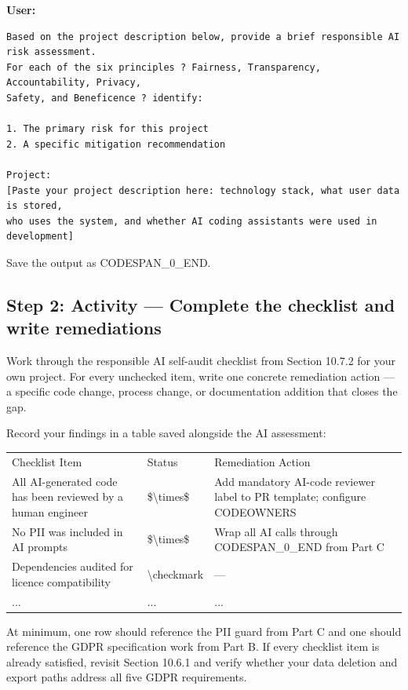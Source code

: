 \documentclass[11pt,a4paper]{book}
\begin{document}
\textbf{User:}
\begin{lstlisting}
Based on the project description below, provide a brief responsible AI risk assessment.
For each of the six principles ? Fairness, Transparency, Accountability, Privacy,
Safety, and Beneficence ? identify:

1. The primary risk for this project
2. A specific mitigation recommendation

Project:
[Paste your project description here: technology stack, what user data is stored,
who uses the system, and whether AI coding assistants were used in development]
\end{lstlisting}

Save the output as CODESPAN\_0\_END.

\subsection{Step 2: Activity --- Complete the checklist and write remediations}

Work through the responsible AI self-audit checklist from Section 10.7.2 for your own project. For every unchecked item, write one concrete remediation action --- a specific code change, process change, or documentation addition that closes the gap.

Record your findings in a table saved alongside the AI assessment:

\begin{tabular}{lll}
\hline
Checklist Item & Status & Remediation Action \\
All AI-generated code has been reviewed by a human engineer & \$\textbackslash{}times\$ & Add mandatory AI-code reviewer label to PR template; configure CODEOWNERS \\
No PII was included in AI prompts & \$\textbackslash{}times\$ & Wrap all AI calls through CODESPAN\_0\_END from Part C \\
Dependencies audited for licence compatibility & \textbackslash{}checkmark{} & --- \\
... & ... & ... \\
\hline
\end{tabular}

At minimum, one row should reference the PII guard from Part C and one should reference the GDPR specification work from Part B. If every checklist item is already satisfied, revisit Section 10.6.1 and verify whether your data deletion and export paths address all five GDPR requirements.
\end{document}
